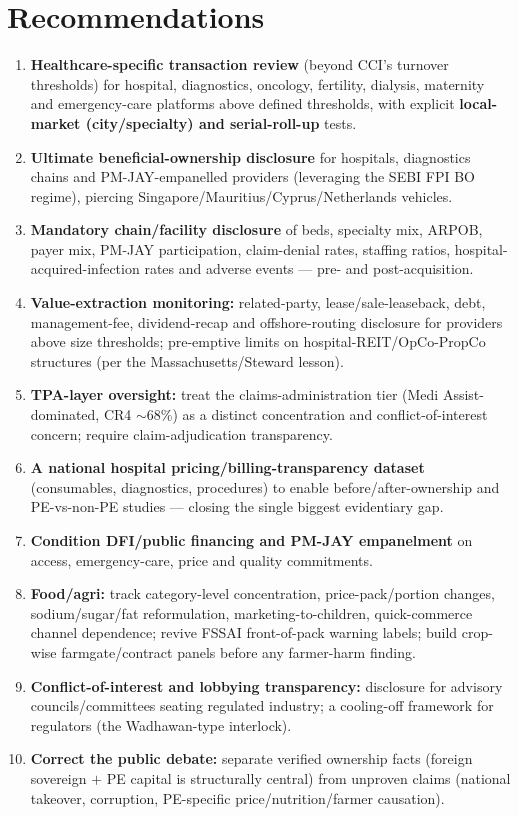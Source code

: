 \documentclass[11pt,a4paper]{article}
\begin{document}
\section{Recommendations}\label{sec:recommendations}
\begin{enumerate}[leftmargin=1.6em,itemsep=3pt]
\item \textbf{Healthcare-specific transaction review} (beyond CCI's turnover thresholds) for hospital, diagnostics, oncology, fertility, dialysis, maternity and emergency-care platforms above defined thresholds, with explicit \textbf{local-market (city/specialty) and serial-roll-up} tests.
\item \textbf{Ultimate beneficial-ownership disclosure} for hospitals, diagnostics chains and PM-JAY-empanelled providers (leveraging the SEBI FPI BO regime), piercing Singapore/Mauritius/Cyprus/Netherlands vehicles.
\item \textbf{Mandatory chain/facility disclosure} of beds, specialty mix, ARPOB, payer mix, PM-JAY participation, claim-denial rates, staffing ratios, hospital-acquired-infection rates and adverse events --- pre- and post-acquisition.
\item \textbf{Value-extraction monitoring:} related-party, lease/sale-leaseback, debt, management-fee, dividend-recap and offshore-routing disclosure for providers above size thresholds; pre-emptive limits on hospital-REIT/OpCo-PropCo structures (per the Massachusetts/Steward lesson).
\item \textbf{TPA-layer oversight:} treat the claims-administration tier (Medi Assist-dominated, CR4 $\sim$68\%) as a distinct concentration and conflict-of-interest concern; require claim-adjudication transparency.
\item \textbf{A national hospital pricing/billing-transparency dataset} (consumables, diagnostics, procedures) to enable before/after-ownership and PE-vs-non-PE studies --- closing the single biggest evidentiary gap.
\item \textbf{Condition DFI/public financing and PM-JAY empanelment} on access, emergency-care, price and quality commitments.
\item \textbf{Food/agri:} track category-level concentration, price-pack/portion changes, sodium/sugar/fat reformulation, marketing-to-children, quick-commerce channel dependence; revive FSSAI front-of-pack warning labels; build crop-wise farmgate/contract panels before any farmer-harm finding.
\item \textbf{Conflict-of-interest and lobbying transparency:} disclosure for advisory councils/committees seating regulated industry; a cooling-off framework for regulators (the Wadhawan-type interlock).
\item \textbf{Correct the public debate:} separate verified ownership facts (foreign sovereign $+$ PE capital is structurally central) from unproven claims (national takeover, corruption, PE-specific price/nutrition/farmer causation).
\end{enumerate}
\end{document}
